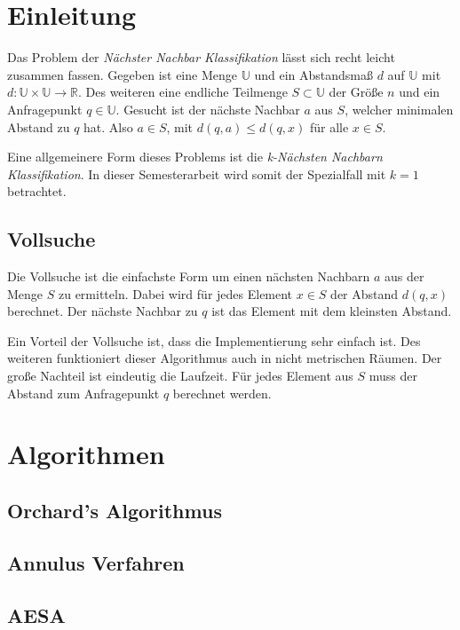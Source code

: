\documentclass[deutsch,runningheads,a4paper]{llncs}
\begin{document}
  \tableofcontents
  \newpage
  
  \section{Einleitung}
    Das Problem der \textit{Nächster Nachbar Klassifikation} lässt sich recht leicht zusammen fassen. Gegeben ist eine
    Menge $\mathbb{U}$ und ein Abstandsmaß $d$ auf $\mathbb{U}$ mit $d: \mathbb{U} \times \mathbb{U} \to \mathbb{R}$.
    Des weiteren eine endliche Teilmenge $S \subset \mathbb{U}$ der Größe $n$ und ein Anfragepunkt $q \in \mathbb{U}$.
    Gesucht ist der nächste Nachbar $a$ aus $S$, welcher minimalen Abstand zu $q$ hat. Also $a \in S$, mit
    $d(q, a) \le d(q, x)$ f\"ur alle $x \in S$.
    
    Eine allgemeinere Form dieses Problems ist die \textit{k-Nächsten Nachbarn Klassifikation}. In dieser
    Semesterarbeit wird somit der Spezialfall mit $k = 1$ betrachtet.
  
  \subsection{Vollsuche}
    Die Vollsuche ist die einfachste Form um einen nächsten Nachbarn $a$ aus der Menge $S$ zu ermitteln.
    Dabei wird für jedes Element $x \in S$ der Abstand $d(q, x)$ berechnet. Der nächste Nachbar zu $q$ ist das Element
    mit dem kleinsten Abstand.
    
    Ein Vorteil der Vollsuche ist, dass die Implementierung sehr einfach ist. Des weiteren funktioniert dieser
    Algorithmus auch in nicht metrischen Räumen. Der große Nachteil ist eindeutig die Laufzeit. Für jedes Element aus
    $S$ muss der Abstand zum Anfragepunkt $q$ berechnet werden.
    
  \section{Algorithmen}
    
  \subsection{Orchard's Algorithmus}
  
  \subsection{Annulus Verfahren}
  
  \subsection{AESA}
\end{document}

